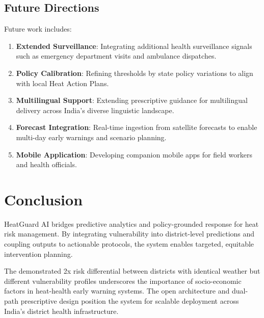 \documentclass[conference]{IEEEtran}
\begin{document}
\subsection{Future Directions}
Future work includes:
\begin{enumerate}
    \item \textbf{Extended Surveillance}: Integrating additional health surveillance signals such as emergency department visits and ambulance dispatches.
    \item \textbf{Policy Calibration}: Refining thresholds by state policy variations to align with local Heat Action Plans.
    \item \textbf{Multilingual Support}: Extending prescriptive guidance for multilingual delivery across India's diverse linguistic landscape.
    \item \textbf{Forecast Integration}: Real-time ingestion from satellite forecasts to enable multi-day early warnings and scenario planning.
    \item \textbf{Mobile Application}: Developing companion mobile apps for field workers and health officials.
\end{enumerate}

\section{Conclusion}
\label{sec:conclusion}

HeatGuard AI bridges predictive analytics and policy-grounded response for heat risk management. By integrating vulnerability into district-level predictions and coupling outputs to actionable protocols, the system enables targeted, equitable intervention planning.

The demonstrated 2x risk differential between districts with identical weather but different vulnerability profiles underscores the importance of socio-economic factors in heat-health early warning systems. The open architecture and dual-path prescriptive design position the system for scalable deployment across India's district health infrastructure.
\end{document}

